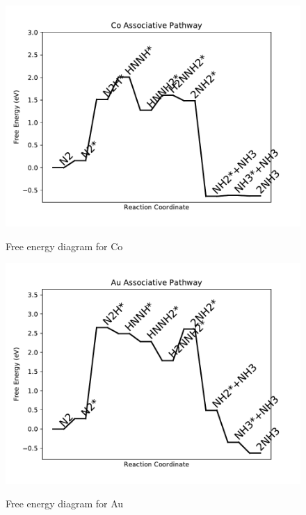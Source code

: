 \documentclass{article}
\begin{document}
\newpage
\begin{figure}
\includegraphics[width=1\linewidth]{data/plots/Co_associative.pdf}
\label{fig:Co_associative}
\caption{Free energy diagram for Co}
\end{figure}

\begin{figure}
\includegraphics[width=1\linewidth]{data/plots/Au_associative.pdf}
\label{fig:Au_associative}
\caption{Free energy diagram for Au}
\end{figure}
\end{document}
